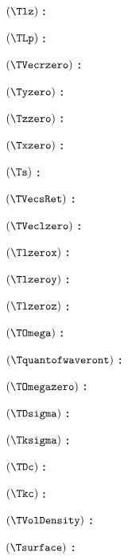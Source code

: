 $( \Tlz )$ \textbf{:} \Tlzdef

$( \TLp )$ \textbf{:} \TLpdef

$( \TVecrzero )$ \textbf{:} \TVecrzerodef

$( \Tyzero )$ \textbf{:} \Tyzerodef

$( \Tzzero )$ \textbf{:} \Tzzerodef

$( \Txzero )$ \textbf{:} \Txzerodef

$( \Ts )$ \textbf{:} \Tsdef

$( \TVecsRet )$ \textbf{:} \TVecsRetdef

$( \TVeclzero )$ \textbf{:} \TVeclzerodef

$( \Tlzerox )$ \textbf{:} \Tlzeroxdef

$( \Tlzeroy )$ \textbf{:} \Tlzeroydef

$( \Tlzeroz )$ \textbf{:} \Tlzerozdef

$( \TOmega )$ \textbf{:} \TOmegadef

$( \Tquantofwaveront )$ \textbf{:} \Tquantofwaverontdef

$( \TOmegazero )$ \textbf{:} \TOmegazerodef

$( \TDsigma )$ \textbf{:} \TDsigmadef

$( \Tksigma )$ \textbf{:} \Tksigmadef

$( \TDc )$ \textbf{:} \TDcdef

$( \Tkc )$ \textbf{:} \Tkcdef

$( \TVolDensity )$ \textbf{:} \TVolDensitydef

$( \Tsurface )$ \textbf{:} \Tsurfacedef
